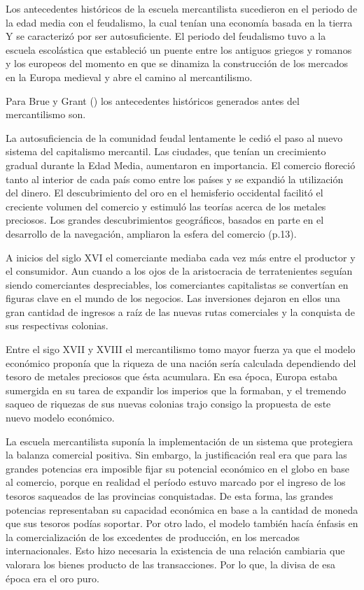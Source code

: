 \documentclass[
  jou,
  floatsintext,
  longtable,
  a4paper,
  nolmodern,
  notxfonts,
  notimes,
  colorlinks=true,linkcolor=blue,citecolor=blue,urlcolor=blue]{apa7}
\begin{document}
Los antecedentes históricos de la escuela mercantilista sucedieron en el
periodo de la edad media con el feudalismo, la cual tenían una economía
basada en la tierra Y se caracterizó por ser autosuficiente. El periodo
del feudalismo tuvo a la escuela escolástica que estableció un puente
entre los antiguos griegos y romanos y los europeos del momento en que
se dinamiza la construcción de los mercados en la Europa medieval y abre
el camino al mercantilismo.

Para Brue y Grant
() los
antecedentes históricos generados antes del mercantilismo son.

La autosuficiencia de la comunidad feudal lentamente le cedió el paso al
nuevo sistema del capitalismo mercantil. Las ciudades, que tenían un
crecimiento gradual durante la Edad Media, aumentaron en importancia. El
comercio floreció tanto al interior de cada país como entre los países y
se expandió la utilización del dinero. El descubrimiento del oro en el
hemisferio occidental facilitó el creciente volumen del comercio y
estimuló las teorías acerca de los metales preciosos. Los grandes
descubrimientos geográficos, basados en parte en el desarrollo de la
navegación, ampliaron la esfera del comercio (p.13).

A inicios del siglo XVI el comerciante mediaba cada vez más entre el
productor y el consumidor. Aun cuando a los ojos de la aristocracia de
terratenientes seguían siendo comerciantes despreciables, los
comerciantes capitalistas se convertían en figuras clave en el mundo de
los negocios. Las inversiones dejaron en ellos una gran cantidad de
ingresos a raíz de las nuevas rutas comerciales y la conquista de sus
respectivas colonias.

Entre el sigo XVII y XVIII el mercantilismo tomo mayor fuerza ya que el
modelo económico proponía que la riqueza de una nación sería calculada
dependiendo del tesoro de metales preciosos que ésta acumulara. En esa
época, Europa estaba sumergida en su tarea de expandir los imperios que
la formaban, y el tremendo saqueo de riquezas de sus nuevas colonias
trajo consigo la propuesta de este nuevo modelo económico.

La escuela mercantilista suponía la implementación de un sistema que
protegiera la balanza comercial positiva. Sin embargo, la justificación
real era que para las grandes potencias era imposible fijar su potencial
económico en el globo en base al comercio, porque en realidad el período
estuvo marcado por el ingreso de los tesoros saqueados de las provincias
conquistadas. De esta forma, las grandes potencias representaban su
capacidad económica en base a la cantidad de moneda que sus tesoros
podías soportar. Por otro lado, el modelo también hacía énfasis en la
comercialización de los excedentes de producción, en los mercados
internacionales. Esto hizo necesaria la existencia de una relación
cambiaria que valorara los bienes producto de las transacciones. Por lo
que, la divisa de esa época era el oro puro.
\end{document}
